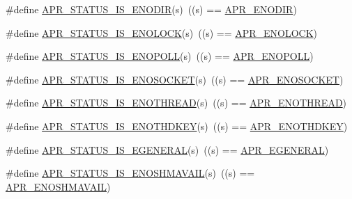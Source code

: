 \begin{DoxyCompactItemize}
\#define \hyperlink{group___a_p_r___s_t_a_t_u_s___i_s_ga666c0bcfb97d26df7e7e360041d93fc6}{A\-P\-R\-\_\-\-S\-T\-A\-T\-U\-S\-\_\-\-I\-S\-\_\-\-E\-N\-O\-D\-I\-R}(s)~((s) == \hyperlink{group___a_p_r___error_ga9a8077e85b6241c1e91b69548395fc09}{A\-P\-R\-\_\-\-E\-N\-O\-D\-I\-R})
\item 
\#define \hyperlink{group___a_p_r___s_t_a_t_u_s___i_s_gaced66cdb08529210dbf2f6bcbba99258}{A\-P\-R\-\_\-\-S\-T\-A\-T\-U\-S\-\_\-\-I\-S\-\_\-\-E\-N\-O\-L\-O\-C\-K}(s)~((s) == \hyperlink{group___a_p_r___error_ga9c411624c42f7562a5c6c3461bdcb0ec}{A\-P\-R\-\_\-\-E\-N\-O\-L\-O\-C\-K})
\item 
\#define \hyperlink{group___a_p_r___s_t_a_t_u_s___i_s_ga590bc2090fe120d142853dec27eaf9e8}{A\-P\-R\-\_\-\-S\-T\-A\-T\-U\-S\-\_\-\-I\-S\-\_\-\-E\-N\-O\-P\-O\-L\-L}(s)~((s) == \hyperlink{group___a_p_r___error_gaeff8d4ed7bf9b99cbe62a3e7068e85b7}{A\-P\-R\-\_\-\-E\-N\-O\-P\-O\-L\-L})
\item 
\#define \hyperlink{group___a_p_r___s_t_a_t_u_s___i_s_gae415d3119f7b13edc8af627a5e3f440b}{A\-P\-R\-\_\-\-S\-T\-A\-T\-U\-S\-\_\-\-I\-S\-\_\-\-E\-N\-O\-S\-O\-C\-K\-E\-T}(s)~((s) == \hyperlink{group___a_p_r___error_ga99e125e203a1d44f12bd88b41696716d}{A\-P\-R\-\_\-\-E\-N\-O\-S\-O\-C\-K\-E\-T})
\item 
\#define \hyperlink{group___a_p_r___s_t_a_t_u_s___i_s_gaf33e51e4df639e2b93c99a2fa8b5c7e7}{A\-P\-R\-\_\-\-S\-T\-A\-T\-U\-S\-\_\-\-I\-S\-\_\-\-E\-N\-O\-T\-H\-R\-E\-A\-D}(s)~((s) == \hyperlink{group___a_p_r___error_ga7b43e1e075ff031e142aa809295ee441}{A\-P\-R\-\_\-\-E\-N\-O\-T\-H\-R\-E\-A\-D})
\item 
\#define \hyperlink{group___a_p_r___s_t_a_t_u_s___i_s_ga782b37d892214ee60911062791871ae2}{A\-P\-R\-\_\-\-S\-T\-A\-T\-U\-S\-\_\-\-I\-S\-\_\-\-E\-N\-O\-T\-H\-D\-K\-E\-Y}(s)~((s) == \hyperlink{group___a_p_r___error_ga29faf801fac647a14360e7493f7fd74e}{A\-P\-R\-\_\-\-E\-N\-O\-T\-H\-D\-K\-E\-Y})
\item 
\#define \hyperlink{group___a_p_r___s_t_a_t_u_s___i_s_gab015701a084807912b3c0464c6badf1a}{A\-P\-R\-\_\-\-S\-T\-A\-T\-U\-S\-\_\-\-I\-S\-\_\-\-E\-G\-E\-N\-E\-R\-A\-L}(s)~((s) == \hyperlink{group___a_p_r___error_ga18f5678bea0c2c704a2b6a186c9e158b}{A\-P\-R\-\_\-\-E\-G\-E\-N\-E\-R\-A\-L})
\item 
\#define \hyperlink{group___a_p_r___s_t_a_t_u_s___i_s_ga99af86378a3ac8eb5a59f1acffec6440}{A\-P\-R\-\_\-\-S\-T\-A\-T\-U\-S\-\_\-\-I\-S\-\_\-\-E\-N\-O\-S\-H\-M\-A\-V\-A\-I\-L}(s)~((s) == \hyperlink{group___a_p_r___error_ga67516f4e87197490333480a8bbc78725}{A\-P\-R\-\_\-\-E\-N\-O\-S\-H\-M\-A\-V\-A\-I\-L})

\end{DoxyCompactItemize}
